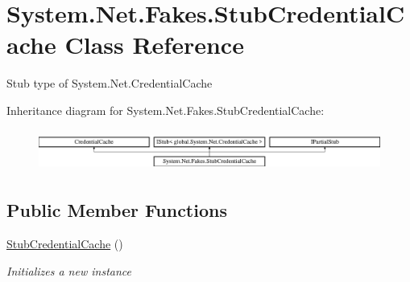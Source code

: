 \hypertarget{class_system_1_1_net_1_1_fakes_1_1_stub_credential_cache}{\section{System.\-Net.\-Fakes.\-Stub\-Credential\-Cache Class Reference}
\label{class_system_1_1_net_1_1_fakes_1_1_stub_credential_cache}
}


Stub type of System.\-Net.\-Credential\-Cache 


Inheritance diagram for System.\-Net.\-Fakes.\-Stub\-Credential\-Cache\-:\begin{figure}[H]
\begin{center}
\leavevmode
\includegraphics[height=1.372549cm]{class_system_1_1_net_1_1_fakes_1_1_stub_credential_cache}
\end{center}
\end{figure}
\subsection*{Public Member Functions}
\begin{DoxyCompactItemize}
\item 
\hyperlink{class_system_1_1_net_1_1_fakes_1_1_stub_credential_cache_aaf80c8090e0bb3e77e0f12eb5f9b3a3c}{Stub\-Credential\-Cache} ()
\begin{DoxyCompactList}\small\item\em Initializes a new instance\end{DoxyCompactList}\end{DoxyCompactItemize}
